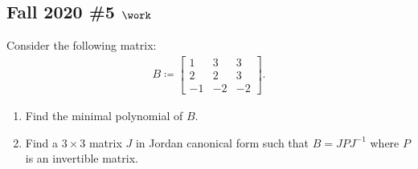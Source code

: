 \hypertarget{fall-2020-5-work}{%
\subsection{\texorpdfstring{Fall 2020 \#5
\(\work\)}{Fall 2020 \#5 \textbackslash work}}\label{fall-2020-5-work}}

Consider the following matrix:
\begin{align*}
B \coloneqq
\begin{bmatrix}
1 & 3 & 3
\\
2 & 2 & 3
\\
-1 & -2 & -2
\end{bmatrix}
.\end{align*}

\begin{enumerate}
\def\labelenumi{\alph{enumi}.}
\item
  Find the minimal polynomial of \(B\).
\item
  Find a \(3\times 3\) matrix \(J\) in Jordan canonical form such that
  \(B = JPJ^{-1}\) where \(P\) is an invertible matrix.
\end{enumerate}


\printbibliography[title=Bibliography]




